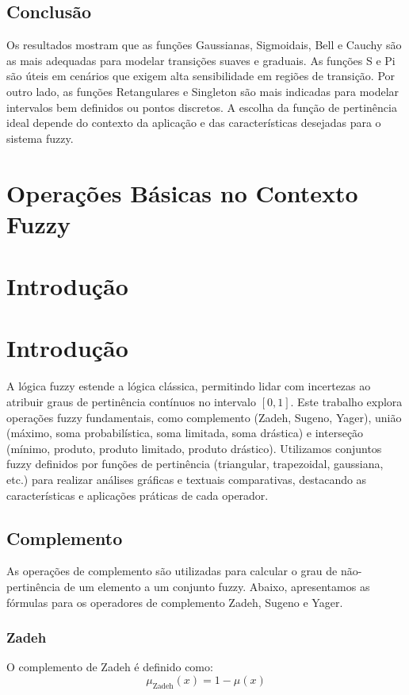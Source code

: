 \documentclass[a4paper,12pt]{article}
\begin{document}
\subsection{Conclusão}

Os resultados mostram que as funções Gaussianas, Sigmoidais, Bell e Cauchy são as mais adequadas para modelar transições suaves e graduais. As funções S e Pi são úteis em cenários que exigem alta sensibilidade em regiões de transição. Por outro lado, as funções Retangulares e Singleton são mais indicadas para modelar intervalos bem definidos ou pontos discretos. A escolha da função de pertinência ideal depende do contexto da aplicação e das características desejadas para o sistema fuzzy.


\section{Operações Básicas no Contexto Fuzzy}

\section{Introdução}

\section{Introdução}

A lógica fuzzy estende a lógica clássica, permitindo lidar com incertezas ao atribuir graus de pertinência contínuos no intervalo $[0, 1]$. Este trabalho explora operações fuzzy fundamentais, como complemento (Zadeh, Sugeno, Yager), união (máximo, soma probabilística, soma limitada, soma drástica) e interseção (mínimo, produto, produto limitado, produto drástico). Utilizamos conjuntos fuzzy definidos por funções de pertinência (triangular, trapezoidal, gaussiana, etc.) para realizar análises gráficas e textuais comparativas, destacando as características e aplicações práticas de cada operador.

\subsection{Complemento}

As operações de complemento são utilizadas para calcular o grau de não-pertinência de um elemento a um conjunto fuzzy. Abaixo, apresentamos as fórmulas para os operadores de complemento Zadeh, Sugeno e Yager.

\subsubsection{Zadeh}
O complemento de Zadeh é definido como:
\[
\mu_{\text{Zadeh}}(x) = 1 - \mu(x)
\]
\end{document}
